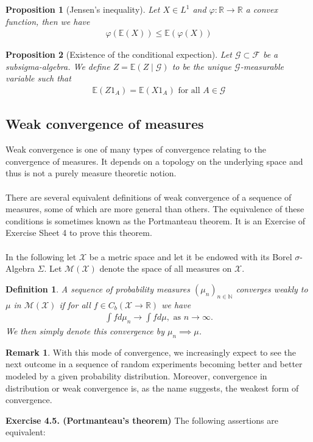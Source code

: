 \documentclass[11pt,a4paper, final]{article}
\newtheorem{prop}{Proposition}[section]
\newtheorem{defn}{Definition}[section]
\theoremstyle{definition}
\newtheorem{rem}{Remark}[section]
\begin{document}
\begin{prop}[Jensen's inequality] Let $X \in L^1$ and $\varphi: \mathbb{R} \to \mathbb{R}$ a convex function, then we have 
\begin{align*}
\varphi( \mathbb{E}(X)) \leq \mathbb{E}( \varphi(X))
\end{align*}
\end{prop}
\begin{prop}[Existence of the conditional expection] Let $\mathcal{G} \subset \mathcal{F}$ be a subsigma-algebra. We define $Z= \mathbb{E}(Z \mid \mathcal{G})$ to be the unique $\mathcal{G}$-measurable variable such that 
\begin{align*}
\mathbb{E}(Z 1_A) = \mathbb{E}(X 1_A) \text{ for all } A \in \mathcal{G}
\end{align*}
\end{prop}
\newpage
\subsection{Weak convergence of measures}
Weak convergence is one of many types of convergence relating to the convergence of measures. It depends on a topology on the underlying space and thus is not a purely measure theoretic notion. 
\\\\
There are several equivalent definitions of weak convergence of a sequence of measures, some of which are more general than others. The equivalence of these conditions is sometimes known as the Portmanteau theorem. It is an Exercise of Exercise Sheet 4 to prove this theorem.
\\\\
In the following let $\mathcal{X}$ be a metric space and let it be endowed with its Borel $\sigma$-Algebra $\Sigma$. Let $\mathcal{M}( \mathcal{X})$ denote the space of all measures on $\mathcal{X}$. 
\begin{defn} A sequence of probability measures $( \mu_n)_{n \in \mathbb{N}}$ converges weakly to $\mu$ in $\mathcal{M}( \mathcal{X})$ if for all $f \in C_b( \mathcal{X} \to \mathbb{R})$ we have
\begin{align*}
\int f d \mu_n \to \int f d \mu, \text{ as } n \to \infty. \tag{*}
\end{align*}
We then simply denote this convergence by $\mu_n \implies \mu$. 
\end{defn}
\begin{rem}With this mode of convergence, we increasingly expect to see the next outcome in a sequence of random experiments becoming better and better modeled by a given probability distribution. Moreover, convergence in distribution or weak convergence is, as the name suggests, the weakest form of convergence. 
\end{rem}
\noindent 
\textbf{Exercise 4.5. (Portmanteau's theorem)} The following assertions are equivalent:
\end{document}
